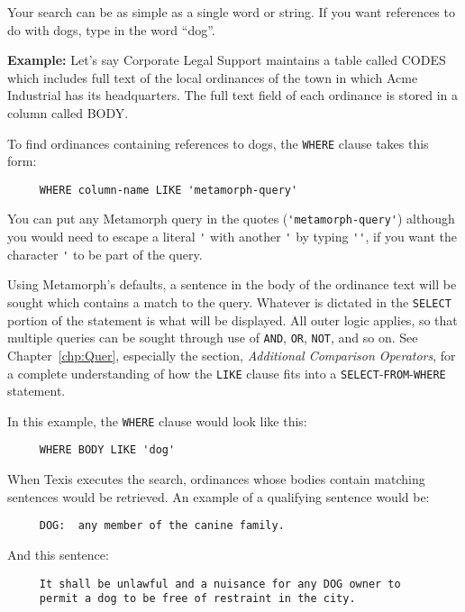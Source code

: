 Your search can be as simple as a single word or string.  If you want
references to do with dogs, type in the word ``dog''.

{\bf Example:}
Let's say Corporate Legal Support maintains a table called CODES which
includes full text of the local ordinances of the town in which Acme
Industrial has its headquarters.  The full text field of each
ordinance is stored in a column called BODY.

To find ordinances containing references to dogs, the \verb`WHERE` clause
takes this form:

\begin{verbatim}
     WHERE column-name LIKE 'metamorph-query'
\end{verbatim}

You can put any Metamorph query in the quotes (\verb`'metamorph-query'`)
although you would need to escape a literal \verb`'` with another
\verb`'` by typing \verb`''`, if you want the character \verb`'` to be
part of the query.

Using Metamorph's defaults, a sentence in the body of the ordinance
text will be sought which contains a match to the query.  Whatever is
dictated in the \verb`SELECT` portion of the statement is what will be
displayed.  All outer logic applies, so that multiple queries can be
sought through use of {\tt AND}, {\tt OR}, {\tt NOT}, and so on.  See
Chapter~\ref{chp:Quer}, especially the section, {\em Additional
Comparison Operators}, for a complete understanding of how the \verb`LIKE`
clause fits into a \verb`SELECT`-\verb`FROM`-\verb`WHERE` statement.

In this example, the \verb`WHERE` clause would look like this:

\begin{verbatim}
     WHERE BODY LIKE 'dog'
\end{verbatim}

When Texis executes the search, ordinances whose bodies contain
matching sentences would be retrieved.  An example of a qualifying
sentence would be:

\begin{verbatim}
     DOG:  any member of the canine family.
\end{verbatim}

And this sentence:

\begin{verbatim}
     It shall be unlawful and a nuisance for any DOG owner to
     permit a dog to be free of restraint in the city.
\end{verbatim}


